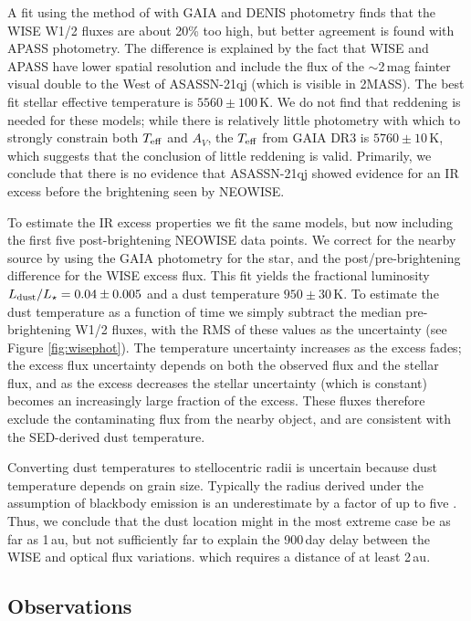 \documentclass[sn-nature]{sn-jnl}%
\newcommand{\asas}{ASASSN-21qj}
\begin{document}
A fit using the method of \cite{2019MNRAS.488.3588Y} with GAIA and DENIS photometry finds that the WISE W1/2 fluxes are about 20\% too high, but better agreement is found with APASS photometry.
%
The difference is explained by the fact that WISE and APASS have lower spatial resolution and include the flux of the $\sim$2\,mag fainter visual double to the West of \asas{} (which is visible in 2MASS).
%
The best fit stellar effective temperature is $5560 \pm 100$\,K.
%
We do not find that reddening is needed for these models; while there is relatively little photometry with which to strongly constrain both $T_{\rm eff}$ and $A_V$, the $T_{\rm eff}$ from GAIA DR3 is $5760 \pm 10$\,K, which suggests that the conclusion of little reddening is valid.
%
Primarily, we conclude that there is no evidence that \asas{} showed evidence for an IR excess before the brightening seen by NEOWISE.

To estimate the IR excess properties we fit the same models, but now including the first five post-brightening NEOWISE data points.
%
We correct for the nearby source by using the GAIA photometry for the star, and the post/pre-brightening difference for the WISE excess flux.
%
This fit yields the fractional luminosity $L_{\rm dust}/L_\star = 0.04 \pm 0.005$ and a dust temperature $950 \pm 30$\,K.
%
To estimate the dust temperature as a function of time we simply subtract the median pre-brightening W1/2 fluxes, with the RMS of these values as the uncertainty (see Figure \ref{fig:wisephot}).
%
The temperature uncertainty increases as the excess fades; the excess flux uncertainty depends on both the observed flux and the stellar flux, and as the excess decreases the stellar uncertainty (which is constant) becomes an increasingly large fraction of the excess.
%
These fluxes therefore exclude the contaminating flux from the nearby object, and are consistent with the SED-derived dust temperature.

Converting dust temperatures to stellocentric radii is uncertain because dust temperature depends on grain size.
%
Typically the radius derived under the assumption of blackbody emission is an underestimate by a factor of up to five \citep{2013MNRAS.428.1263B,2015MNRAS.454.3207P}.
%
Thus, we conclude that the dust location might in the most extreme case be as far as 1\,au, but not sufficiently far to explain the 900\,day delay between the WISE and optical flux variations. which requires a distance of at least 2\,au.


\subsection*{Observations}\label{sec:obs}
\end{document}
